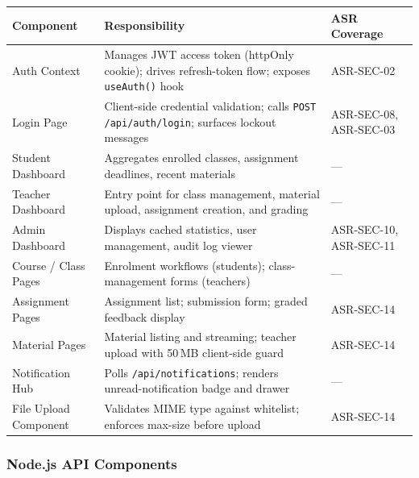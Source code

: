 \documentclass[12pt,a4paper]{article}
\begin{document}
\begin{tabularx}{\textwidth}{L{3.5cm} L{6.5cm} L{3.5cm}}
  \toprule
  \textbf{Component} & \textbf{Responsibility} & \textbf{ASR Coverage} \\
  \midrule
  Auth Context & Manages JWT access token (httpOnly cookie); drives refresh-token flow; exposes \texttt{useAuth()} hook & ASR-SEC-02 \\
  Login Page & Client-side credential validation; calls \texttt{POST /api/auth/login}; surfaces lockout messages & ASR-SEC-08, ASR-SEC-03 \\
  Student Dashboard & Aggregates enrolled classes, assignment deadlines, recent materials & --- \\
  Teacher Dashboard & Entry point for class management, material upload, assignment creation, and grading & --- \\
  Admin Dashboard & Displays cached statistics, user management, audit log viewer & ASR-SEC-10, ASR-SEC-11 \\
  Course / Class Pages & Enrolment workflows (students); class-management forms (teachers) & --- \\
  Assignment Pages & Assignment list; submission form; graded feedback display & ASR-SEC-14 \\
  Material Pages & Material listing and streaming; teacher upload with 50\,MB client-side guard & ASR-SEC-14 \\
  Notification Hub & Polls \texttt{/api/notifications}; renders unread-notification badge and drawer & --- \\
  File Upload Component & Validates MIME type against whitelist; enforces max-size before upload & ASR-SEC-14 \\
  \bottomrule
\end{tabularx}

\subsubsection{Node.js API Components}
\end{document}
